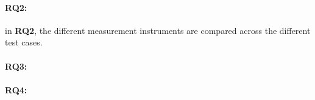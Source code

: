\paragraph*{RQ2:}  in \textbf{RQ2}, the different measurement instruments are compared across the different test cases.

\paragraph*{RQ3:}


\paragraph*{RQ4:}






















